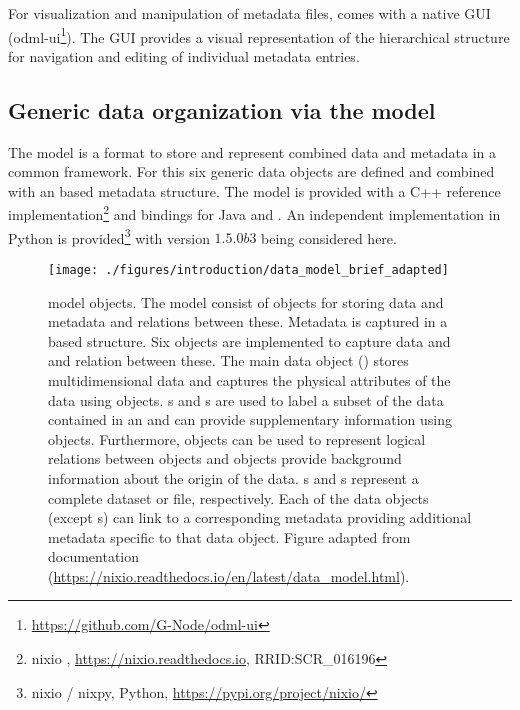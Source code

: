 For visualization and manipulation of metadata files,  comes with a native  GUI (odml-ui\footnote{\url{https://github.com/G-Node/odml-ui}}). The GUI provides a visual representation of the hierarchical structure for navigation and editing of individual metadata entries.


\subsection{Generic data organization via the  model}
The  model is a format to store and represent combined data and metadata in a common framework. For this six generic data objects are defined and combined with an  based metadata structure. The  model is provided with a C++ reference implementation\footnote{nixio , \url{https://nixio.readthedocs.io},  RRID:SCR\_016196} and bindings for Java and . An independent implementation in Python is provided\footnote{nixio / nixpy, Python, \url{https://pypi.org/project/nixio/}} with version $1.5.0b3$ being considered here.

\begin{figure}[hbtp]
 \texttt{[image: ./figures/introduction/data\_model\_brief\_adapted]}
 \caption[ model objects]{ model objects. The model consist of objects for storing data and metadata and relations between these. Metadata is captured in a  based structure. Six objects are implemented to capture data and and relation between these. The main data object () stores multidimensional data and captures the physical attributes of the data using  objects. s and s are used to label a subset of the data contained in an  and can provide supplementary information using  objects. Furthermore,  objects can be used to represent logical relations between objects and  objects provide background information about the origin of the data. s and s represent a complete dataset or file, respectively. Each of the data objects (except s) can link to a corresponding metadata  providing additional metadata specific to that data object. Figure adapted from  documentation (\url{https://nixio.readthedocs.io/en/latest/data_model.html}).}
 \label{fig:intro_nix_model}
\end{figure}

